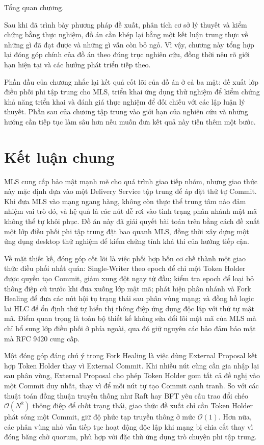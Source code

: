 \documentclass[../DoAn.tex]{subfiles}
\begin{document}
Tổng quan chương.

Sau khi đã trình bày phương pháp đề xuất, phân tích cơ sở lý thuyết và kiểm chứng bằng thực nghiệm, đồ án cần khép lại bằng một kết luận trung thực về những gì đã đạt được và những gì vẫn còn bỏ ngỏ. Vì vậy, chương này tổng hợp lại đóng góp chính của đồ án theo đúng trục nghiên cứu, đồng thời nêu rõ giới hạn hiện tại và các hướng phát triển tiếp theo.

Phần đầu của chương nhắc lại kết quả cốt lõi của đồ án ở cả ba mặt: đề xuất lớp điều phối phi tập trung cho MLS, triển khai ứng dụng thử nghiệm để kiểm chứng khả năng triển khai và đánh giá thực nghiệm để đối chiếu với các lập luận lý thuyết. Phần sau của chương tập trung vào giới hạn của nghiên cứu và những hướng cần tiếp tục làm sâu hơn nếu muốn đưa kết quả này tiến thêm một bước.

\section{Kết luận chung}

MLS \cite{rfc9420} cung cấp bảo mật mạnh mẽ cho quá trình giao tiếp nhóm, nhưng giao thức này mặc định dựa vào một Delivery Service tập trung để áp đặt thứ tự Commit. Khi đưa MLS vào mạng ngang hàng, không còn thực thể trung tâm nào đảm nhiệm vai trò đó, và hệ quả là các nút dễ rơi vào tình trạng phân nhánh mật mã không thể tự khôi phục. Đồ án này đã giải quyết bài toán trên bằng cách đề xuất một lớp điều phối phi tập trung đặt bao quanh MLS, đồng thời xây dựng một ứng dụng desktop thử nghiệm để kiểm chứng tính khả thi của hướng tiếp cận.

Về mặt thiết kế, đóng góp cốt lõi là việc phối hợp bốn cơ chế thành một giao thức điều phối nhất quán: Single-Writer theo epoch để chỉ một Token Holder được quyền tạo Commit, giảm xung đột ngay từ đầu; kiểm tra epoch để loại bỏ thông điệp cũ trước khi đưa xuống lớp mật mã; phát hiện phân nhánh và Fork Healing để đưa các nút hội tụ trạng thái sau phân vùng mạng; và đồng hồ logic lai HLC để ổn định thứ tự hiển thị thông điệp ứng dụng độc lập với thứ tự mật mã. Điểm quan trọng là toàn bộ thiết kế không sửa đổi lõi mật mã của MLS mà chỉ bổ sung lớp điều phối ở phía ngoài, qua đó giữ nguyên các bảo đảm bảo mật mà RFC 9420 cung cấp.

Một đóng góp đáng chú ý trong Fork Healing là việc dùng External Proposal kết hợp Token Holder thay vì External Commit. Khi nhiều nút cùng cần gia nhập lại sau phân vùng, External Proposal cho phép Token Holder gom tất cả đề nghị vào một Commit duy nhất, thay vì để mỗi nút tự tạo Commit cạnh tranh. So với các thuật toán đồng thuận truyền thống như Raft hay BFT yêu cầu trao đổi chéo $\mathcal{O}(N^2)$ thông điệp để chốt trạng thái, giao thức đề xuất chỉ cần Token Holder phát sóng một Commit, giữ độ phức tạp truyền thông ở mức $\mathcal{O}(1)$. Hơn nữa, các phân vùng nhỏ vẫn tiếp tục hoạt động độc lập khi mạng bị chia cắt thay vì đóng băng chờ quorum, phù hợp với đặc thù ứng dụng trò chuyện phi tập trung.
\end{document}
